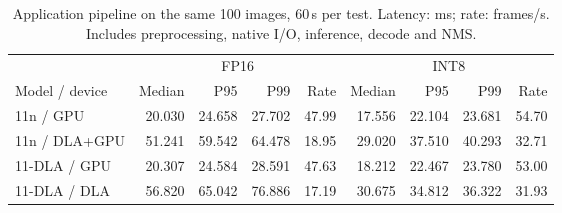 \begin{table}[t]
\caption{Application pipeline on the same 100 images, 60\,s per test. Latency: ms; rate: frames/s. Includes preprocessing, native I/O, inference, decode and NMS.}
\label{tab:e2e}\centering\footnotesize
\setlength{\tabcolsep}{4pt}
\begin{tabular*}{\textwidth}{@{\extracolsep{\fill}}lrrrrrrrr@{}}
\toprule
& \multicolumn{4}{c}{FP16} & \multicolumn{4}{c}{INT8} \\
\cmidrule(lr){2-5}\cmidrule(l){6-9}
Model / device & Median & P95 & P99 & Rate & Median & P95 & P99 & Rate \\
\midrule
11n / GPU & 20.030 & 24.658 & 27.702 & 47.99 & 17.556 & 22.104 & 23.681 & 54.70 \\
11n / DLA+GPU & 51.241 & 59.542 & 64.478 & 18.95 & 29.020 & 37.510 & 40.293 & 32.71 \\
11-DLA / GPU & 20.307 & 24.584 & 28.591 & 47.63 & 18.212 & 22.467 & 23.780 & 53.00 \\
11-DLA / DLA & 56.820 & 65.042 & 76.886 & 17.19 & 30.675 & 34.812 & 36.322 & 31.93 \\
\bottomrule
\end{tabular*}
\end{table}
